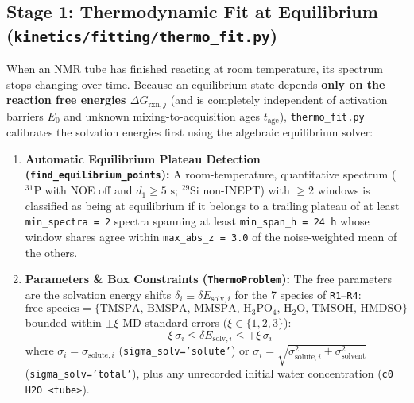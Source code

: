 \documentclass[11pt,a4paper]{article}
\begin{document}
\subsection{Stage 1: Thermodynamic Fit at Equilibrium (\texttt{kinetics/\allowbreak{}fitting/\allowbreak{}thermo\_\allowbreak{}fit.py})}

When an NMR tube has finished reacting at room temperature, its spectrum stops changing over time. Because an equilibrium state depends \textbf{only on the reaction free energies $\Delta G_{\text{rxn}, j}$} (and is completely independent of activation barriers $E_0$ and unknown mixing-to-acquisition ages $t_{\text{age}}$), \texttt{thermo\_\allowbreak{}fit.py} calibrates the solvation energies first using the algebraic equilibrium solver:

\begin{enumerate}[leftmargin=1.8em]
    \item \textbf{Automatic Equilibrium Plateau Detection (\texttt{find\_\allowbreak{}equilibrium\_\allowbreak{}points}):}
    A room-temperature, quantitative spectrum ($^{31}\text{P}$ with NOE off and $d_1 \ge 5\text{ s}$; $^{29}\text{Si}$ non-INEPT) with $\ge 2$ windows is classified as being at equilibrium if it belongs to a trailing plateau of at least \texttt{min\_\allowbreak{}spectra = 2} spectra spanning at least \texttt{min\_\allowbreak{}span\_\allowbreak{}h = 24 h} whose window shares agree within \texttt{max\_\allowbreak{}abs\_\allowbreak{}z = 3.0} of the noise-weighted mean of the others.

    \item \textbf{Parameters \& Box Constraints (\texttt{ThermoProblem}):}
    The free parameters are the solvation energy shifts $\delta_i \equiv \delta E_{\text{solv}, i}$ for the 7 species of \texttt{R1}--\texttt{R4}:
    \begin{equation}
    \text{free\_species} = \{\text{TMSPA},\, \text{BMSPA},\, \text{MMSPA},\, \text{H}_3\text{PO}_4,\, \text{H}_2\text{O},\, \text{TMSOH},\, \text{HMDSO}\}
    \end{equation}
    bounded within $\pm \xi$ MD standard errors ($\xi \in \{1, 2, 3\}$):
    \begin{equation}
    -\xi \, \sigma_{i} \le \delta E_{\text{solv}, i} \le +\xi \, \sigma_{i}
    \end{equation}
    where $\sigma_i = \sigma_{\text{solute}, i}$ (\texttt{sigma\_\allowbreak{}solv='solute'}) or $\sigma_i = \sqrt{\sigma_{\text{solute}, i}^2 + \sigma_{\text{solvent}}^2}$ (\texttt{sigma\_\allowbreak{}solv='total'}), plus any unrecorded initial water concentration (\texttt{c0 H2O <tube>}).


\end{enumerate}
\end{document}
